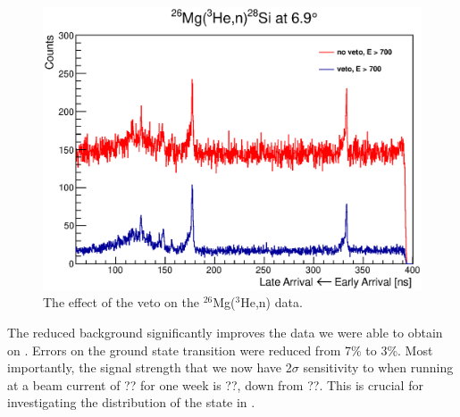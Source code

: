 \begin{figure}[htp]
\centering
\includegraphics[width=5in]{figures/veto_26Mg.eps}
\caption{\label{fig:vetoData}The effect of the veto on the $^{26}$Mg($^3$He,n) data.}
\label{fig:veto_26Mg}
\end{figure}

The reduced background significantly improves the data we were able to obtain on \MgReaction.  Errors on the ground state transition were reduced from 7\% to 3\%.  Most importantly, the signal strength that we now have 2$\sigma$ sensitivity to when running at a beam current of ?? for one week is ??, down from ??.  This is crucial for investigating the distribution of the \zp state in \GeTargets.

